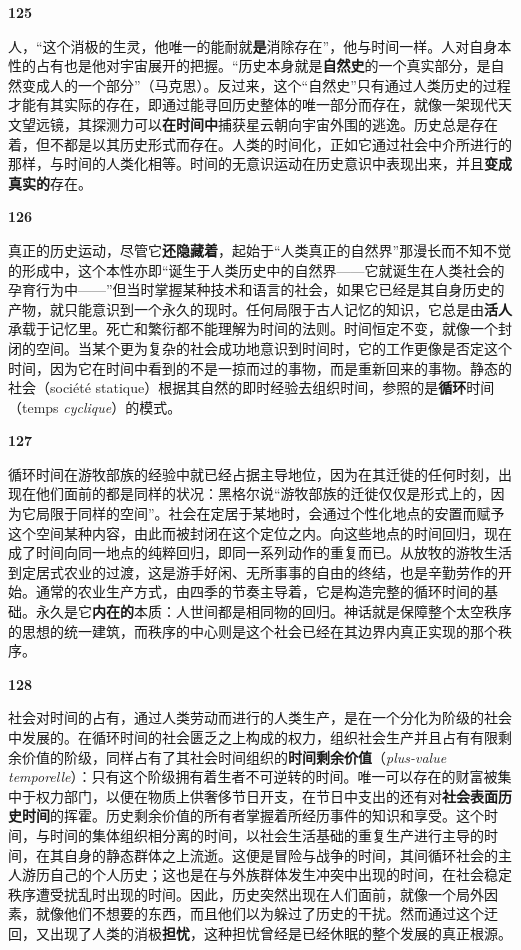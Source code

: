 \documentclass[fontset=fandol, a4paper, 12pt, openright]{ctexbook}
\makeatletter
\newcommand{\thesis}[1]{%
    \par\vspace{1.5em}%
    {\centering \textbf{\Large #1}\par}%
    \nobreak\vspace{0.5em}\nobreak
    \@afterindenttrue %
    \@afterheading    %
}
\makeatother
\begin{document}
\thesis{125}
人，“这个消极的生灵，他唯一的能耐就\textbf{是}消除存在”，他与时间一样。人对自身本性的占有也是他对宇宙展开的把握。“历史本身就是\textbf{自然史}的一个真实部分，是自然变成人的一个部分”（马克思）。反过来，这个“自然史”只有通过人类历史的过程才能有其实际的存在，即通过能寻回历史整体的唯一部分而存在，就像一架现代天文望远镜，其探测力可以\textbf{在时间中}捕获星云朝向宇宙外围的逃逸。历史总是存在着，但不都是以其历史形式而存在。人类的时间化，正如它通过社会中介所进行的那样，与时间的人类化相等。时间的无意识运动在历史意识中表现出来，并且\textbf{变成真实的}存在。

\thesis{126}
真正的历史运动，尽管它\textbf{还隐藏着}，起始于“人类真正的自然界”那漫长而不知不觉的形成中，这个本性亦即“诞生于人类历史中的自然界——它就诞生在人类社会的孕育行为中——”但当时掌握某种技术和语言的社会，如果它已经是其自身历史的产物，就只能意识到一个永久的现时。任何局限于古人记忆的知识，它总是由\textbf{活人}承载于记忆里。死亡和繁衍都不能理解为时间的法则。时间恒定不变，就像一个封闭的空间。当某个更为复杂的社会成功地意识到时间时，它的工作更像是否定这个时间，因为它在时间中看到的不是一掠而过的事物，而是重新回来的事物。静态的社会（société statique）根据其自然的即时经验去组织时间，参照的是\textbf{循环}时间（temps \textit{cyclique}）的模式。

\thesis{127}
循环时间在游牧部族的经验中就已经占据主导地位，因为在其迁徙的任何时刻，出现在他们面前的都是同样的状况：黑格尔说“游牧部族的迁徙仅仅是形式上的，因为它局限于同样的空间”。社会在定居于某地时，会通过个性化地点的安置而赋予这个空间某种内容，由此而被封闭在这个定位之内。向这些地点的时间回归，现在成了时间向同一地点的纯粹回归，即同一系列动作的重复而已。从放牧的游牧生活到定居式农业的过渡，这是游手好闲、无所事事的自由的终结，也是辛勤劳作的开始。通常的农业生产方式，由四季的节奏主导着，它是构造完整的循环时间的基础。永久是它\textbf{内在的}本质：人世间都是相同物的回归。神话就是保障整个太空秩序的思想的统一建筑，而秩序的中心则是这个社会已经在其边界内真正实现的那个秩序。

\thesis{128}
社会对时间的占有，通过人类劳动而进行的人类生产，是在一个分化为阶级的社会中发展的。在循环时间的社会匮乏之上构成的权力，组织社会生产并且占有有限剩余价值的阶级，同样占有了其社会时间组织的\textbf{时间剩余价值}（\textit{plus-value temporelle}）：只有这个阶级拥有着生者不可逆转的时间。唯一可以存在的财富被集中于权力部门，以便在物质上供奢侈节日开支，在节日中支出的还有对\textbf{社会表面历史时间}的挥霍。历史剩余价值的所有者掌握着所经历事件的知识和享受。这个时间，与时间的集体组织相分离的时间，以社会生活基础的重复生产进行主导的时间，在其自身的静态群体之上流逝。这便是冒险与战争的时间，其间循环社会的主人游历自己的个人历史；这也是在与外族群体发生冲突中出现的时间，在社会稳定秩序遭受扰乱时出现的时间。因此，历史突然出现在人们面前，就像一个局外因素，就像他们不想要的东西，而且他们以为躲过了历史的干扰。然而通过这个迂回，又出现了人类的消极\textbf{担忧}，这种担忧曾经是已经休眠的整个发展的真正根源。
\end{document}
